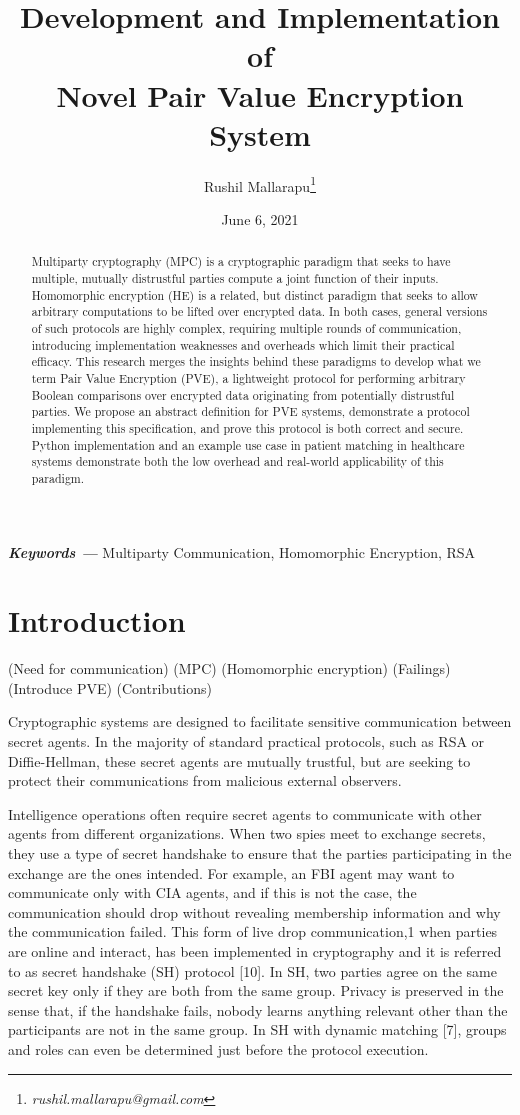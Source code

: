 \documentclass{article}
\title{Development and Implementation of\\Novel Pair Value Encryption System}
\author{Rushil Mallarapu\footnote{\textit{rushil.mallarapu@gmail.com}}}
\date{June 6, 2021}
\providecommand{\keywords}[1]
{
  \small    
  \textbf{\textit{Keywords ---}} #1
}
\begin{document}
\maketitle

\begin{abstract}
    Multiparty cryptography (MPC) is a cryptographic paradigm that seeks to have multiple, mutually distrustful parties compute a joint function of their inputs. Homomorphic encryption (HE) is a related, but distinct paradigm that seeks to allow arbitrary computations to be lifted over encrypted data. In both cases, general versions of such protocols are highly complex, requiring multiple rounds of communication, introducing implementation weaknesses and overheads which limit their practical efficacy. This research merges the insights behind these paradigms to develop what we term Pair Value Encryption (PVE), a lightweight protocol for performing arbitrary Boolean comparisons over encrypted data originating from potentially distrustful parties. We propose an abstract definition for PVE systems, demonstrate a protocol implementing this specification, and prove this protocol is both correct and secure. Python implementation and an example use case in patient matching in healthcare systems demonstrate both the low overhead and real-world applicability of this paradigm.
\end{abstract}

\keywords{Multiparty Communication, Homomorphic Encryption, RSA}

\section{Introduction}


(Need for communication)
(MPC)
(Homomorphic encryption)
(Failings)
(Introduce PVE)
(Contributions)

Cryptographic systems are designed to facilitate sensitive communication between secret agents. In the majority of standard practical protocols, such as RSA or Diffie-Hellman, these secret agents are mutually trustful, but are seeking to protect their communications from malicious external observers.

Intelligence operations often require secret agents to communicate with other agents from different organizations. When two spies meet to exchange secrets, they use a type of secret handshake to ensure that the parties participating in the exchange are the ones intended. For example, an FBI agent may want to communicate only with CIA agents, and if this is not the case, the communication should drop without revealing membership information and why the communication failed. This form of live drop communication,1 when parties are online and interact, has been implemented in cryptography and it is referred to as secret handshake (SH) protocol [10]. In SH, two parties agree on the same secret key only if they are both from the same group. Privacy is preserved in the sense that, if the handshake fails, nobody learns anything relevant other than the participants are not in the same group. In SH with dynamic matching [7], groups and roles can even be determined just before the protocol execution.
\end{document}
